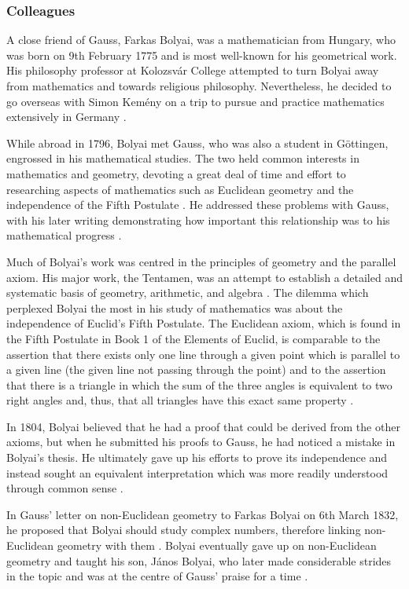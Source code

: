 \documentclass{article}
\begin{document}
\subsubsection{Colleagues}

A close friend of Gauss, Farkas Bolyai, was a mathematician from Hungary, who was born on 9th February 1775 and is most well-known for his geometrical work. His philosophy professor at Kolozsvár College attempted to turn Bolyai away from mathematics and towards religious philosophy. Nevertheless, he decided to go overseas with Simon Kemény on a trip to pursue and practice mathematics extensively in Germany \cite{stigler}. 

While abroad in 1796, Bolyai met Gauss, who was also a student in G\"{o}ttingen, engrossed in his mathematical studies. The two held common interests in mathematics and geometry, devoting a great deal of time and effort to researching aspects of mathematics such as Euclidean geometry and the independence of the Fifth Postulate \cite{stigler}. He addressed these problems with Gauss, with his later writing demonstrating how important this relationship was to his mathematical progress \cite{abardia}. 

Much of Bolyai’s work was centred in the principles of geometry and the parallel axiom. His major work, the Tentamen, was an attempt to establish a detailed and systematic basis of geometry, arithmetic, and algebra \cite{stigler}. The dilemma which perplexed Bolyai the most in his study of mathematics was about the independence of Euclid's Fifth Postulate. The Euclidean axiom, which is found in the Fifth Postulate in Book 1 of the Elements of Euclid, is comparable to the assertion that there exists only one line through a given point which is parallel to a given line (the given line not passing through the point) and to the assertion that there is a triangle in which the sum of the three angles is equivalent to two right angles and, thus, that all triangles have this exact same property \cite{lemley}. 

In 1804, Bolyai believed that he had a proof that could be derived from the other axioms, but when he submitted his proofs to Gauss, he had noticed a mistake in Bolyai’s thesis. He ultimately gave up his efforts to prove its independence and instead sought an equivalent interpretation which was more readily understood through common sense \cite{stigler}.

In Gauss’ letter on non-Euclidean geometry to Farkas Bolyai on 6th March 1832, he proposed that Bolyai should study complex numbers, therefore linking non-Euclidean geometry with them \cite{abardia}. Bolyai eventually gave up on non-Euclidean geometry and taught his son, János Bolyai, who later made considerable strides in the topic and was at the centre of Gauss’ praise for a time \cite{lemley}.
\end{document}
